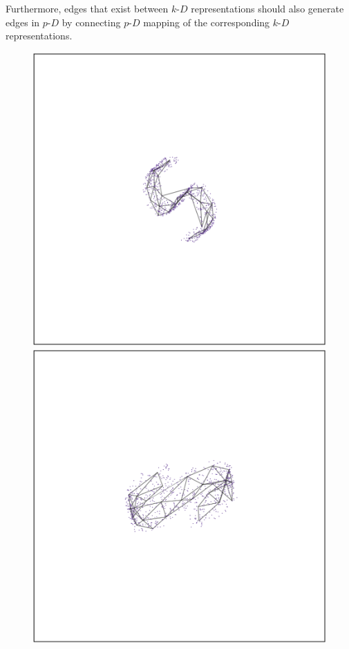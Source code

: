 \documentclass[
  12pt]{article}
\newcommand\pD{$p\text{-}D$}
\newcommand\kD{$k\text{-}D$}
\begin{document}
Furthermore, edges that exist between \kD{} representations should also
generate edges in \pD{} by connecting \pD{} mapping of the corresponding
\kD{} representations.

\begin{figure}[H]

\begin{minipage}{0.33\linewidth}
\includegraphics{figures/scurve/sc_1.png}\end{minipage}%
%
\begin{minipage}{0.33\linewidth}
\includegraphics{figures/scurve/sc_2.png}\end{minipage}%

\end{figure}
\end{document}
